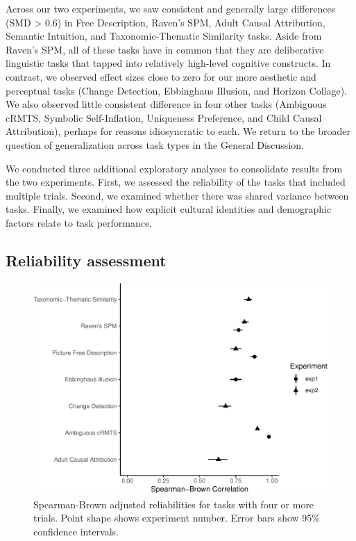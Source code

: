 \documentclass[
  man,floatsintext]{apa6}
\begin{document}
Across our two experiments, we saw consistent and generally large differences (SMD \textgreater{} 0.6) in Free Description, Raven's SPM, Adult Causal Attribution, Semantic Intuition, and Taxonomic-Thematic Similarity tasks. Aside from Raven's SPM, all of these tasks have in common that they are deliberative linguistic tasks that tapped into relatively high-level cognitive constructs. In contrast, we observed effect sizes close to zero for our more aesthetic and perceptual tasks (Change Detection, Ebbinghaus Illusion, and Horizon Collage). We also observed little consistent difference in four other tasks (Ambiguous cRMTS, Symbolic Self-Inflation, Uniqueness Preference, and Child Causal Attribution), perhaps for reasons idiosyncratic to each. We return to the broader question of generalization across task types in the General Discussion.

We conducted three additional exploratory analyses to consolidate results from the two experiments. First, we assessed the reliability of the tasks that included multiple trials. Second, we examined whether there was shared variance between tasks. Finally, we examined how explicit cultural identities and demographic factors relate to task performance.

\hypertarget{reliability-assessment}{%
\subsection{Reliability assessment}\label{reliability-assessment}}

\begin{figure}
\centering
\includegraphics{CCRR_manuscript_files/figure-latex/reliability-1.pdf}
\caption{\label{fig:reliability}Spearman-Brown adjusted reliabilities for tasks with four or more trials. Point shape shows experiment number. Error bars show 95\% confidence intervals.}
\end{figure}
\end{document}
